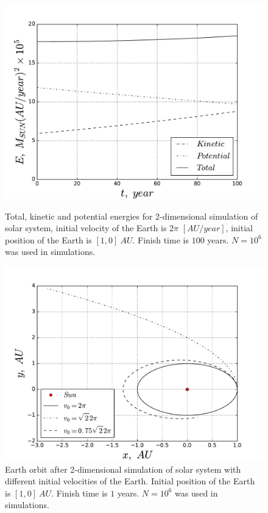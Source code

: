 \documentclass[10pt]{article}
\begin{document}
\begin{figure}[ht]
  \begin{center}
    \includegraphics[scale=0.5]{euler_energy}
    \caption {Total, kinetic and potential energies for 2-dimensional simulation of solar system, initial velocity of the Earth is $2\pi$ $[AU/year]$, initial position of the Earth is $[1,0]\ AU$. Finish time is $100$ years. $N=10^6$ was used in simulations. }
    \label{fig:euler_energy}
  \end{center}

\vspace*{\floatsep}

  \begin{center}
    \includegraphics[scale=0.5]{escape_earth}
    \caption {Earth orbit after 2-dimensional simulation of solar system with different initial velocities of the Earth. Initial position of the Earth is $[1,0]\ AU$. Finish time is $1$ years. $N=10^6$ was used in simulations. }
    \label{fig:escape}
  \end{center}
\end{figure}
\clearpage
\end{document}
